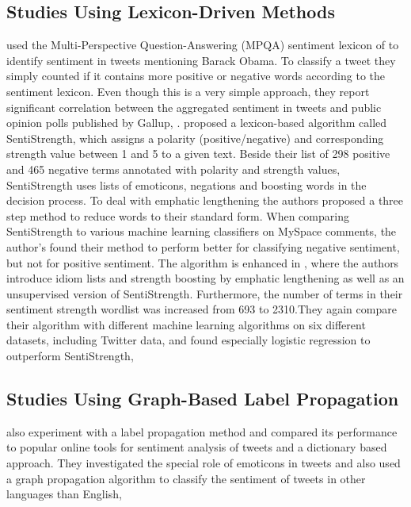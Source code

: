 \subsection{Studies Using Lexicon-Driven Methods}
\cite{ref33} used the Multi-Perspective Question-Answering (MPQA) sentiment
lexicon of \cite{ref34} to identify sentiment in tweets mentioning Barack Obama. To
classify a tweet they simply counted if it contains more positive or negative words according to
the sentiment lexicon. Even though this is a very simple approach, they report significant
correlation between the aggregated sentiment in tweets and public opinion polls published by
Gallup, .
\cite{ref35} proposed a lexicon-based algorithm called SentiStrength, which assigns a
polarity (positive/negative) and corresponding strength value between 1 and 5 to a given text.
Beside their list of 298 positive and 465 negative terms annotated with polarity and strength values,
SentiStrength uses lists of emoticons, negations and boosting words in the decision process. To
deal with emphatic lengthening the authors proposed a three step method to reduce words to their
standard form. When comparing SentiStrength to various machine learning classifiers on MySpace
comments, the author’s found their method to perform better for classifying negative sentiment,
but not for positive sentiment. The algorithm is enhanced in \cite{ref35}, where the
authors introduce idiom lists and strength boosting by emphatic lengthening as well as an
unsupervised version of SentiStrength. Furthermore, the number of terms in their sentiment
strength wordlist was increased from 693 to 2310.They again compare their algorithm with different machine learning algorithms on six different
datasets, including Twitter data, and found especially logistic regression to outperform
SentiStrength, \cite{ref35}

\subsection{Studies Using Graph-Based Label Propagation}
\cite{ref36} also experiment with a label propagation method and compared its performance
to popular online tools for sentiment analysis of tweets and a dictionary based approach. They
investigated the special role of emoticons in tweets and also used a graph propagation algorithm
to classify the sentiment of tweets in other languages than English, \cite{ref37}



